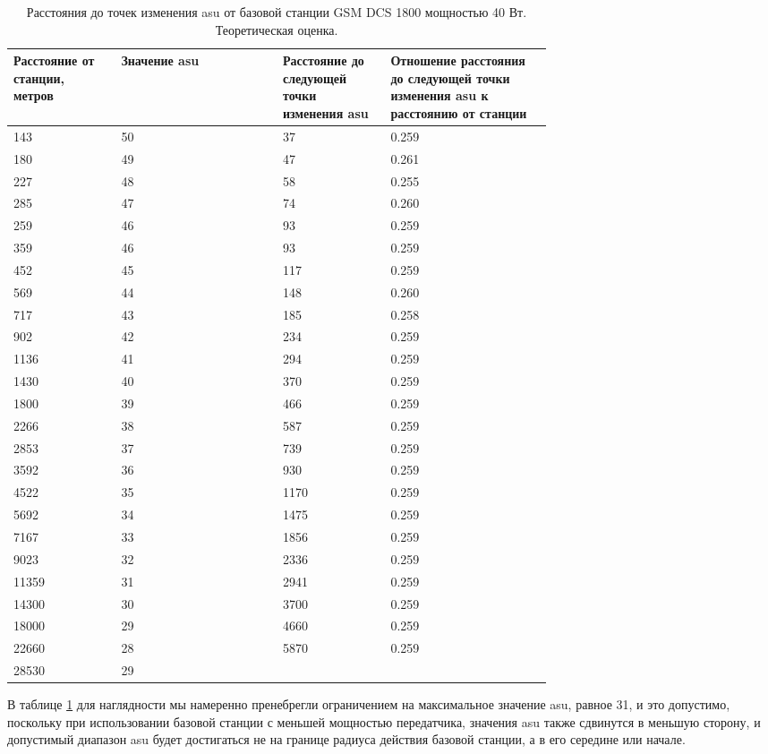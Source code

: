 \begin{table}
	\caption{\label{tab:asuchange}Расстояния до точек изменения asu от базовой станции GSM DCS 1800 мощностью 40 Вт. Теоретическая оценка.}
	\begin{center}
		\begin{tabular}{|p{0.2\linewidth}|l|p{0.2\linewidth}|p{0.3\linewidth}|}
			\hline
			Расстояние от станции, метров & Значение asu & Расстояние до следующей точки изменения asu & Отношение расстояния до следующей точки изменения asu к расстоянию от станции \\
			\hline
			143 & 50 & 37 & 0.259 \\
			\hline
			180 & 49 & 47 & 0.261 \\
			\hline
			227 & 48 & 58 & 0.255 \\
			\hline
			285 & 47 & 74 & 0.260 \\
			\hline
			259 & 46 & 93 & 0.259 \\
			\hline
			359 & 46 & 93 & 0.259 \\
			\hline
			452 & 45 & 117 & 0.259 \\
			\hline
			569 & 44 & 148 & 0.260 \\
			\hline
			717 & 43 & 185 & 0.258 \\
			\hline
			902 & 42 & 234 & 0.259 \\
			\hline
			1136 & 41 & 294 & 0.259 \\
			\hline
			1430 & 40 & 370 & 0.259 \\
			\hline
			1800 & 39 & 466 & 0.259 \\
			\hline
			2266 & 38 & 587 & 0.259 \\
			\hline
			2853 & 37 & 739 & 0.259 \\
			\hline
			3592 & 36 & 930 & 0.259 \\
			\hline
			4522 & 35 & 1170 & 0.259 \\
			\hline
			5692 & 34 & 1475 & 0.259 \\
			\hline
			7167 & 33 & 1856 & 0.259 \\
			\hline
			9023 & 32 & 2336 & 0.259 \\
			\hline
			11359 & 31 & 2941 & 0.259 \\
			\hline
			14300 & 30 & 3700 & 0.259 \\
			\hline
			18000 & 29 & 4660 & 0.259 \\
			\hline
			22660 & 28 & 5870 & 0.259 \\
			\hline
			28530 & 29 & & \\
			\hline
		\end{tabular}
	\end{center}
\end{table}
В таблице \ref{tab:asuchange} для наглядности мы намеренно пренебрегли ограничением на максимальное значение asu, равное 31, и это допустимо, поскольку при использовании базовой станции с меньшей мощностью передатчика, значения asu также сдвинутся в меньшую сторону, и допустимый диапазон asu будет достигаться не на границе радиуса действия базовой станции, а в его середине или начале.

